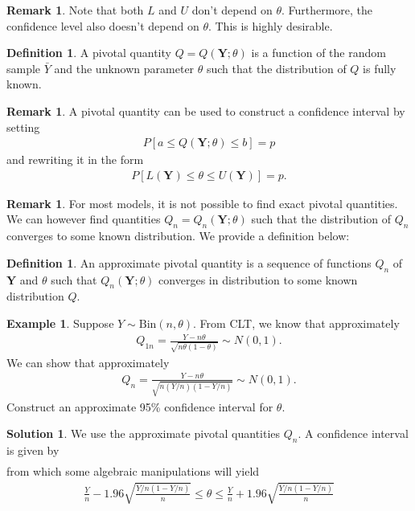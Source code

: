 \documentclass[11pt]{amsart}
\theoremstyle{definition}
\newtheorem{definition}[theorem]{Definition}
\newtheorem{remark}[theorem]{Remark}
\newtheorem{example}[theorem]{Example}
\newtheorem{solution}[theorem]{Solution}
\numberwithin{equation}{section}
\begin{document}
\begin{remark}
    Note that both $L$ and $U$ don't depend on $\theta$. Furthermore, the confidence level also doesn't depend on $\theta$. This is highly desirable.
\end{remark}
\begin{definition}
    A pivotal quantity $Q=Q(\mathbf{Y};\theta)$ is a function of the random sample $\bar Y$ and the unknown parameter $\theta$ such that the distribution of $Q$ is fully known.
\end{definition}
\begin{remark}
    A pivotal quantity can be used to construct a confidence interval by setting
    \begin{align*}
        P[a\le Q(\mathbf{Y};\theta)\le b]=p
    \end{align*}
    and rewriting it in the form
    \begin{align*}
        P[L(\mathbf{Y})\le \theta\le U(\mathbf{Y})]=p.
    \end{align*}
\end{remark}
\begin{remark}
    For most models, it is not possible to find exact pivotal quantities. We can however find quantities $Q_n=Q_n(\mathbf{Y};\theta)$ such that the distribution of $Q_n$ converges to some known distribution. We provide a definition below:
\end{remark}
\begin{definition}
    An approximate pivotal quantity is a sequence of functions $Q_n$ of $\mathbf Y$ and $\theta$ such that $Q_n(\mathbf{Y};\theta)$ converges in distribution to some known distribution $Q$.
\end{definition}
\begin{example}
    Suppose $Y\sim\mathrm{Bin}(n,\theta)$. From CLT, we know that approximately
    \begin{align*}
        Q_{1n}=\frac{Y-n\theta}{\sqrt{n\theta(1-\theta)}}\sim N(0,1).
    \end{align*}
    We can show that approximately
    \begin{align*}
        Q_n=\frac{Y-n\theta}{\sqrt{n(Y/n)(1-Y/n)}}\sim N(0,1).
    \end{align*}
    Construct an approximate 95\% confidence interval for $\theta$.
\end{example}
\addtocounter{theorem}{-1}
\begin{solution}
    We use the approximate pivotal quantities $Q_n$. A confidence interval is given by
    \begin{align*}
        [-1.96\le Q_n\le 1.96]
    \end{align*}
    from which some algebraic manipulations will yield 
    \begin{align*}
        \frac{Y}{n}-1.96\sqrt{\frac{Y/n(1-Y/n)}{n}}\le\theta\le\frac{Y}{n}+1.96\sqrt{\frac{Y/n(1-Y/n)}{n}}
    \end{align*}
\end{solution}
\end{document}
